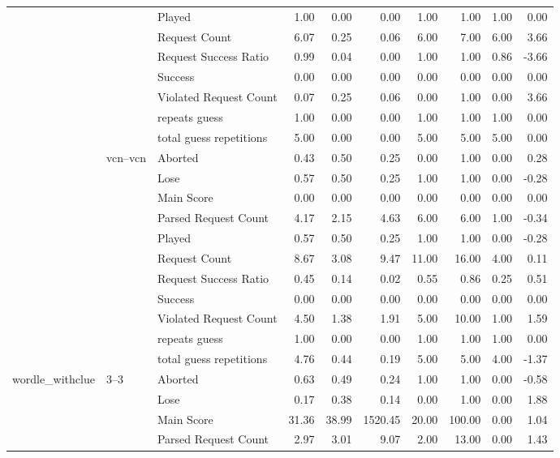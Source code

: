 \begin{tabular}{lllrrrrrrr}
 &  & Played & 1.00 & 0.00 & 0.00 & 1.00 & 1.00 & 1.00 & 0.00 \\
 &  & Request Count & 6.07 & 0.25 & 0.06 & 6.00 & 7.00 & 6.00 & 3.66 \\
 &  & Request Success Ratio & 0.99 & 0.04 & 0.00 & 1.00 & 1.00 & 0.86 & -3.66 \\
 &  & Success & 0.00 & 0.00 & 0.00 & 0.00 & 0.00 & 0.00 & 0.00 \\
 &  & Violated Request Count & 0.07 & 0.25 & 0.06 & 0.00 & 1.00 & 0.00 & 3.66 \\
 &  & repeats guess & 1.00 & 0.00 & 0.00 & 1.00 & 1.00 & 1.00 & 0.00 \\
 &  & total guess repetitions & 5.00 & 0.00 & 0.00 & 5.00 & 5.00 & 5.00 & 0.00 \\
\cline{2-10}
 & \multirow[t]{11}{*}{vcn--vcn} & Aborted & 0.43 & 0.50 & 0.25 & 0.00 & 1.00 & 0.00 & 0.28 \\
 &  & Lose & 0.57 & 0.50 & 0.25 & 1.00 & 1.00 & 0.00 & -0.28 \\
 &  & Main Score & 0.00 & 0.00 & 0.00 & 0.00 & 0.00 & 0.00 & 0.00 \\
 &  & Parsed Request Count & 4.17 & 2.15 & 4.63 & 6.00 & 6.00 & 1.00 & -0.34 \\
 &  & Played & 0.57 & 0.50 & 0.25 & 1.00 & 1.00 & 0.00 & -0.28 \\
 &  & Request Count & 8.67 & 3.08 & 9.47 & 11.00 & 16.00 & 4.00 & 0.11 \\
 &  & Request Success Ratio & 0.45 & 0.14 & 0.02 & 0.55 & 0.86 & 0.25 & 0.51 \\
 &  & Success & 0.00 & 0.00 & 0.00 & 0.00 & 0.00 & 0.00 & 0.00 \\
 &  & Violated Request Count & 4.50 & 1.38 & 1.91 & 5.00 & 10.00 & 1.00 & 1.59 \\
 &  & repeats guess & 1.00 & 0.00 & 0.00 & 1.00 & 1.00 & 1.00 & 0.00 \\
 &  & total guess repetitions & 4.76 & 0.44 & 0.19 & 5.00 & 5.00 & 4.00 & -1.37 \\
\cline{1-10} \cline{2-10}
\multirow[t]{99}{*}{wordle_withclue} & \multirow[t]{11}{*}{3--3} & Aborted & 0.63 & 0.49 & 0.24 & 1.00 & 1.00 & 0.00 & -0.58 \\
 &  & Lose & 0.17 & 0.38 & 0.14 & 0.00 & 1.00 & 0.00 & 1.88 \\
 &  & Main Score & 31.36 & 38.99 & 1520.45 & 20.00 & 100.00 & 0.00 & 1.04 \\
 &  & Parsed Request Count & 2.97 & 3.01 & 9.07 & 2.00 & 13.00 & 0.00 & 1.43 \\

\end{tabular}
